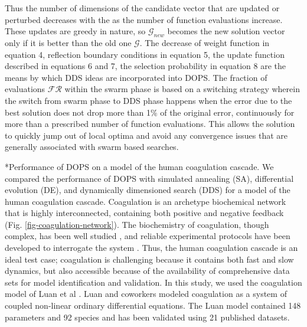 \documentclass[12pt]{article}
\makeatletter
\renewcommand\subsection{\@startsection
	{subsection}{2}{0mm}
	{-0.05in}
	{-0.5\baselineskip}
	{\normalfont\normalsize\bfseries}}
\makeatother
\begin{document}
Thus the number of dimensions of the candidate vector that are updated or perturbed decreases with the as the number of function evaluations increase. These updates are greedy in nature, so $\mathcal{G}_{new}$ becomes the new solution vector only if it is better than the old one $\mathcal{G}$. The decrease of weight function in equation 4, reflection boundary conditions in equation 5, the update function described in equations 6 and 7, the selection probability in equation 8 are the means by which DDS ideas are incorporated into DOPS.
The fraction of evaluations $\mathcal{FR}$  within the swarm phase is based on a switching strategy wherein the switch from swarm phase to DDS phase happens when the error due to the best solution does not drop more than 1\% of the original error, continuously for more than a prescribed number of function evaluations. This allows the solution to quickly jump out of local optima and avoid any convergence issues that are generally associated with swarm based searches.

\clearpage

\subsection*{Performance of DOPS on a model of the human coagulation cascade.}
We compared the performance of DOPS with simulated annealing (SA), differential evolution (DE), and dynamically dimensioned search (DDS) for a model of the human coagulation cascade.
Coagulation is an archetype biochemical network that is highly interconnected, containing both positive and negative feedback (Fig. \ref{fig-coagulation-network}).
The biochemistry of coagulation, though complex, has been well studied \cite{mann2003dynamics,mann2003all,mann2003thrombin,vogler2009contact,diamond2013systems,fogelson2005coagulation,anand2003model},
and reliable experimental protocols have been developed to interrogate the system \cite{hockin2002model,chatterjee2010systems,mann2006models,luan2007computationally}.
Thus, the human coagulation cascade is an ideal test case;
coagulation is challenging because it contains both fast and slow dynamics, but also accessible because of the availability of comprehensive data sets for model identification and validation.
In this study, we used the coagulation model of Luan et al \cite{luan2007computationally}. Luan and coworkers modeled coagulation as a system of coupled non-linear ordinary differential equations.
The Luan model contained 148 parameters and 92 species and has been validated using 21 published datasets.
\end{document}
